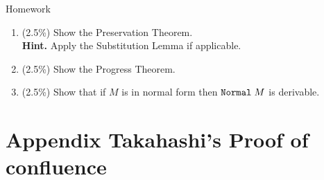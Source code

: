 
\begin{frame}{Homework}
  \begin{enumerate}
    \item (2.5\%) Show the Preservation Theorem. \\
      \textbf{Hint.} Apply the Substitution Lemma if applicable. 
    \item (2.5\%) Show the Progress Theorem.
    \item (2.5\%) Show that if $M$ is in normal form then $\mathtt{Normal}\;M$ is derivable.
  \end{enumerate}
  
\end{frame}

%
%
% 
%

\appendix
\section{Appendix Takahashi's Proof of confluence}

